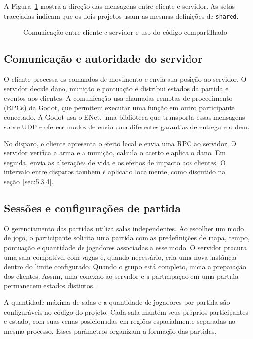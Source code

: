 A Figura~\ref{fig:tcc2-2} mostra a direção das mensagens entre cliente e servidor. As setas tracejadas indicam que os dois projetos usam as mesmas definições de \texttt{shared}.

\begin{figure}[htbp]
\centering
\caption{Comunicação entre cliente e servidor e uso do código compartilhado}
\label{fig:tcc2-2}

\end{figure}

\subsection{Comunicação e autoridade do servidor}\label{sec:5.2.2}

O cliente processa os comandos de movimento e envia sua posição ao servidor. O servidor decide dano, munição e pontuação e distribui estados da partida e eventos aos clientes. A comunicação usa chamadas remotas de procedimento (RPCs) da Godot, que permitem executar uma função em outro participante conectado. A Godot usa o ENet, uma biblioteca que transporta essas mensagens sobre UDP e oferece modos de envio com diferentes garantias de entrega e ordem. \cite{GODOT-REDE} \cite{GODOT-PEER}

No disparo, o cliente apresenta o efeito local e envia uma RPC ao servidor. O servidor verifica a arma e a munição, calcula o acerto e aplica o dano. Em seguida, envia as alterações de vida e os efeitos de impacto aos clientes. O intervalo entre disparos também é aplicado localmente, como discutido na seção~\ref{sec:5.3.4}.

\subsection{Sessões e configurações de partida}\label{sec:5.2.3}

O gerenciamento das partidas utiliza salas independentes. Ao escolher um modo de jogo, o participante solicita uma partida com as predefinições de mapa, tempo, pontuação e quantidade de jogadores associadas a esse modo. O servidor procura uma sala compatível com vagas e, quando necessário, cria uma nova instância dentro do limite configurado. Quando o grupo está completo, inicia a preparação dos clientes. Assim, uma conexão ao servidor e a participação em uma partida permanecem estados distintos.

A quantidade máxima de salas e a quantidade de jogadores por partida são configuráveis no código do projeto. Cada sala mantém seus próprios participantes e estado, com suas cenas posicionadas em regiões espacialmente separadas no mesmo processo. Esses parâmetros organizam a formação das partidas.

